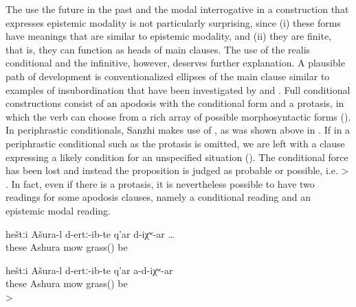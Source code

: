 The use the future in the past and the modal interrogative in a construction that expresses epistemic modality is not particularly surprising, since (i) these forms have meanings that are similar to epistemic modality, and (ii) they are finite, that is, they can function as heads of main clauses. The use of the realis conditional and the infinitive, however, deserves further explanation. A plausible path of development is conventionalized ellipses of the main clause similar to examples of insubordination that have been investigated by \citet{Evans2007} and \citet{EvansWatanabe2016}. Full conditional constructions consist of an apodosis with the conditional form and a protasis, in which the verb can choose from a rich array of possible morphosyntactic forms (). In periphrastic conditionals, Sanzhi makes use of , as was shown above in . If in a periphrastic conditional such as  the protasis is omitted, we are left with a clause expressing a likely condition for an unspecified situation (). The conditional force has been lost and instead the proposition is judged as probable or possible, i.e.  >  . In fact, even if there is a protasis, it is nevertheless possible to have two readings for some apodosis clauses, namely a conditional reading and an epistemic modal reading.
%
\begin{exe}
	\ex	\label{ex:Ashura mows the lawn}
	\begin{xlist}
		\ex	\label{ex:‎‎If Ashura has mowed this grass@A}
		\gll	heštːi	Ašura-l d-ertː-ib-te	q'ar	d-iχʷ-ar \ldots\\
			these	Ashura	mow 	grass() be\\
		\glt	{}

		\ex	\label{ex:‎‎If Ashura has not mowed this grass@B}
		\gll	heštːi	Ašura-l d-ertː-ib-te	q'ar	a-d-iχʷ-ar \\
			these	Ashura	mow 	grass() be\\
		\glt	{} > 
	\end{xlist}
\end{exe}

